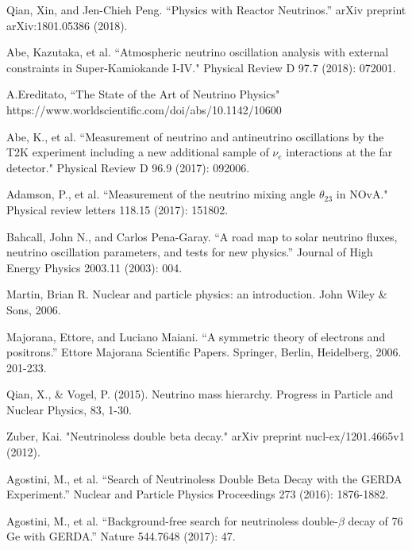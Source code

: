 \documentclass[preprint,12pt]{elsarticle}
\numberwithin{equation}{section}
\begin{document}
\begin{thebibliography}{00}
	 Qian, Xin, and Jen-Chieh Peng. ``Physics with Reactor Neutrinos.'' arXiv preprint arXiv:1801.05386 (2018).
	
	 Abe, Kazutaka, et al. ``Atmospheric neutrino oscillation analysis with external constraints in Super-Kamiokande I-IV." Physical Review D 97.7 (2018): 072001.
	
	 A.Ereditato, ``The State of the Art of Neutrino Physics" https://www.worldscientific.com/doi/abs/10.1142/10600
	
	 Abe, K., et al. ``Measurement of neutrino and antineutrino oscillations by the T2K experiment including a new additional sample of $\nu_e$ interactions at the far detector." Physical Review D 96.9 (2017): 092006.
	
	 Adamson, P., et al. ``Measurement of the neutrino mixing angle $\theta_{23}$ in NOvA." Physical review letters 118.15 (2017): 151802.
	
	 Bahcall, John N., and Carlos Pena-Garay. ``A road map to solar neutrino fluxes, neutrino oscillation parameters, and tests for new physics.'' Journal of High Energy Physics 2003.11 (2003): 004.
	
	 Martin, Brian R. Nuclear and particle physics: an introduction. John Wiley \& Sons, 2006.
	
	 Majorana, Ettore, and Luciano Maiani. ``A symmetric theory of electrons and positrons.'' Ettore Majorana Scientific Papers. Springer, Berlin, Heidelberg, 2006. 201-233.
	
	 Qian, X., \& Vogel, P. (2015). Neutrino mass hierarchy. Progress in Particle and Nuclear Physics, 83, 1-30.
	
	
	
	 Zuber, Kai. "Neutrinoless double beta decay." arXiv preprint nucl-ex/1201.4665v1 (2012).
	
	 Agostini, M., et al. ``Search of Neutrinoless Double Beta Decay with the GERDA Experiment.'' Nuclear and Particle Physics Proceedings 273 (2016): 1876-1882. 
	
	 Agostini, M., et al. ``Background-free search for neutrinoless double-$\beta$ decay of 76 Ge with GERDA.'' Nature 544.7648 (2017): 47.
	

\end{thebibliography}
\end{document}
